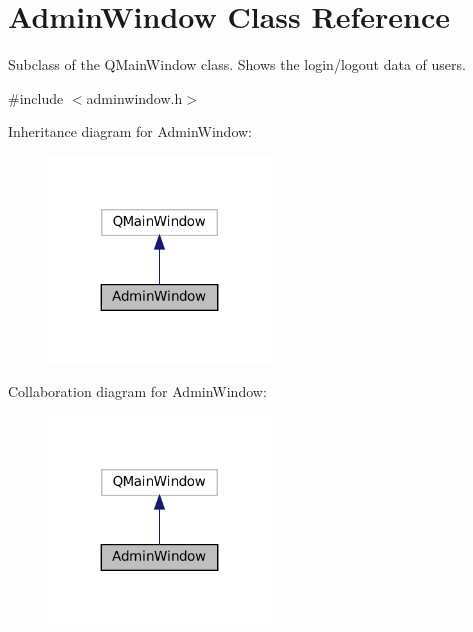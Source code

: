 \hypertarget{classAdminWindow}{}\section{Admin\+Window Class Reference}
\label{classAdminWindow}


Subclass of the Q\+Main\+Window class. Shows the login/logout data of users.  




{\ttfamily \#include $<$adminwindow.\+h$>$}



Inheritance diagram for Admin\+Window\+:
\nopagebreak
\begin{figure}[H]
\begin{center}
\leavevmode
\includegraphics[width=167pt]{classAdminWindow__inherit__graph}
\end{center}
\end{figure}


Collaboration diagram for Admin\+Window\+:
\nopagebreak
\begin{figure}[H]
\begin{center}
\leavevmode
\includegraphics[width=167pt]{classAdminWindow__coll__graph}
\end{center}
\end{figure}
